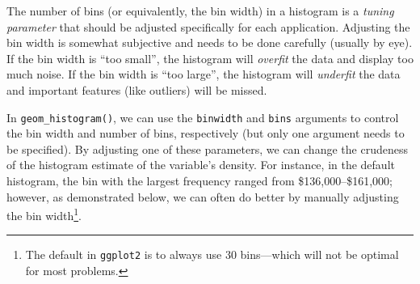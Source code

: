 \documentclass[]{book}
\let\rmarkdownfootnote\footnote%
\def\footnote{\protect\rmarkdownfootnote}
\theoremstyle{definition}
\theoremstyle{definition}
\theoremstyle{definition}
\theoremstyle{remark}
\let\BeginKnitrBlock\begin \let\EndKnitrBlock\end
\begin{document}
\BeginKnitrBlock{tip}
The number of bins (or equivalently, the bin width) in a histogram is a
\emph{tuning parameter} that should be adjusted specifically for each
application. Adjusting the bin width is somewhat subjective and needs to
be done carefully (usually by eye). If the bin width is ``too small'',
the histogram will \emph{overfit} the data and display too much noise.
If the bin width is ``too large'', the histogram will \emph{underfit}
the data and important features (like outliers) will be missed.
\EndKnitrBlock{tip}

In \texttt{geom\_histogram()}, we can use the \texttt{binwidth} and
\texttt{bins} arguments to control the bin width and number of bins,
respectively (but only one argument needs to be specified). By adjusting
one of these parameters, we can change the crudeness of the histogram
estimate of the variable's density. For instance, in the default
histogram, the bin with the largest frequency ranged from
\$136,000--\$161,000; however, as demonstrated below, we can often do
better by manually adjusting the bin width\footnote{The default in
  \texttt{ggplot2} is to always use 30 bins---which will not be optimal
  for most problems.}.
\end{document}
